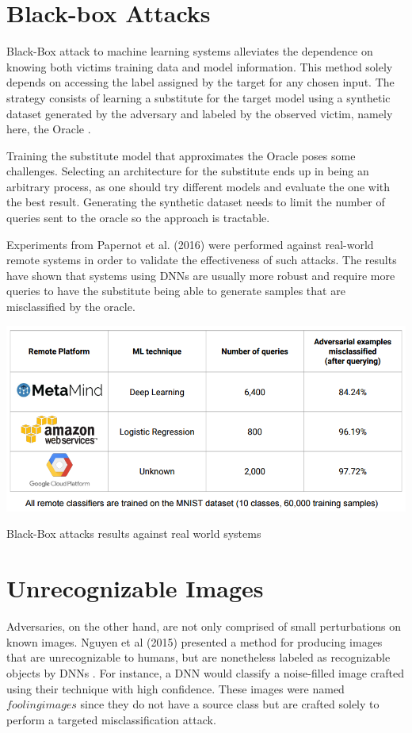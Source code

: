 \section{Black-box Attacks}
Black-Box attack to machine learning systems alleviates the dependence on knowing both victims training data and model information. This method solely depends on accessing the label assigned by the target for any chosen input. The strategy consists of learning a substitute for the target model using a synthetic dataset generated by the adversary and labeled by the observed victim, namely here, the Oracle \cite{papernot2016}.

Training the substitute model that approximates the Oracle poses some challenges. Selecting an architecture for the substitute ends up in being an arbitrary process, as one should try different models and evaluate the one with the best result. Generating the synthetic dataset needs to limit the number of queries sent to the oracle so the approach is tractable. 

Experiments from Papernot et al. (2016) were performed against real-world remote systems in order to validate the effectiveness of such attacks. The results have shown that systems using DNNs are usually more robust and require more queries to have the substitute being able to generate samples that are misclassified by the oracle.

\begin{table}[!h]
\centering
	\includegraphics[scale=0.7]{black_box.png}
\caption{Black-Box attacks results against real world systems}
\label{tbl:black_box}
\end{table}

\section{Unrecognizable Images}\label{subsec:unrec}

Adversaries, on the other hand, are not only comprised of small perturbations on known images. Nguyen et al (2015) presented a method for producing images that are unrecognizable to humans, but are nonetheless labeled as recognizable objects by DNNs \cite{nguyen2015}. For instance, a DNN would classify a noise-filled image crafted using their technique with high confidence. These images were named $fooling images$ since they do not have a source class but are crafted solely to perform a targeted misclassification attack.

